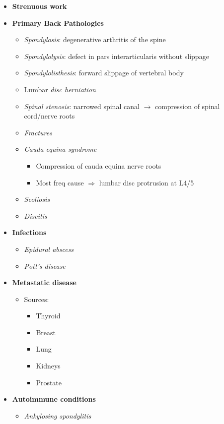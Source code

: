 \documentclass[
  14pt,
]{extarticle}
\providecommand{\tightlist}{%
  \setlength{\itemsep}{0pt}\setlength{\parskip}{0pt}}
\begin{document}
\begin{itemize}
\item
  \textbf{Strenuous work}
\item
  \textbf{Primary Back Pathologies}

  \begin{itemize}
  \tightlist
  \item
    \emph{Spondylosis}: degenerative arthritis of the spine
  \item
    \emph{Spondylolysis}: defect in pars interarticularis without
    slippage
  \item
    \emph{Spondylolisthesis}: forward slippage of vertebral body
  \item
    Lumbar \emph{disc herniation}
  \item
    \emph{Spinal stenosis}: narrowed spinal canal \(\rightarrow\)
    compression of spinal cord/nerve roots
  \item
    \emph{Fractures}
  \item
    \emph{Cauda equina syndrome}

    \begin{itemize}
    \tightlist
    \item
      Compression of cauda equina nerve roots
    \item
      Most freq cause \(\Rightarrow\) lumbar disc protrusion at L4/5
    \end{itemize}
  \item
    \emph{Scoliosis}
  \item
    \emph{Discitis}
  \end{itemize}
\item
  \textbf{Infections}

  \begin{itemize}
  \tightlist
  \item
    \emph{Epidural abscess}
  \item
    \emph{Pott's disease}
  \end{itemize}
\item
  \textbf{Metastatic disease}

  \begin{itemize}
  \tightlist
  \item
    Sources:

    \begin{itemize}
    \tightlist
    \item
      Thyroid
    \item
      Breast
    \item
      Lung
    \item
      Kidneys
    \item
      Prostate
    \end{itemize}
  \end{itemize}
\item
  \textbf{Autoimmune conditions}

  \begin{itemize}
  \tightlist
  \item
    \emph{Ankylosing spondylitis}
  \end{itemize}
\end{itemize}
\end{document}
